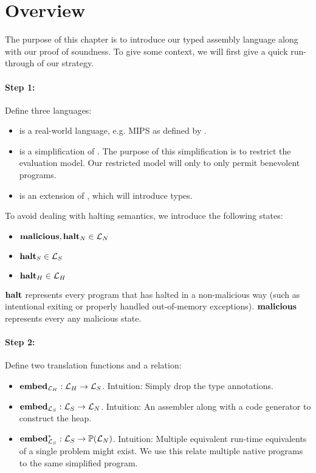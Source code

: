 \section{Overview}

The purpose of this chapter is to introduce our typed assembly language along
with our proof of soundness. To give some context, we will first give a quick
run-through of our strategy.

\paragraph{Step 1:} Define three languages:

\begin{itemize}
\item \nativelang is a real-world language, e.g. MIPS as defined by
  \cite{mipssys}.
\item \simplelang is a simplification of \nativelang. The purpose of
  this simplification is to restrict the evaluation model. Our restricted model
  will only to only permit benevolent programs.
\item \highlang is an extension of \simplelang, which will
  introduce types.
\end{itemize}

To avoid dealing with halting semantics, we introduce the following states:
\begin{itemize}
\item ${\mathbf{malicious}}, {\mathbf{halt}_N} \in \mathcal{L}_N$
\item ${\mathbf{halt}_S} \in \mathcal{L}_S$
\item ${\mathbf{halt}_H} \in \mathcal{L}_H$
\end{itemize}

$\mathbf{halt}$ represents every program that has halted in a non-malicious way (such as
intentional exiting or properly handled out-of-memory exceptions). ${\mathbf{malicious}}$
represents every any malicious state.

\paragraph{Step 2:} Define two translation functions and a relation:

\begin{itemize}
\item ${\mathbf{embed}}_{\mathcal{L}_H} : \mathcal{L}_H -> \mathcal{L}_S$. Intuition: Simply drop the type
  annotations.
\item ${\mathbf{embed}}_{\mathcal{L}_S} : \mathcal{L}_S -> \mathcal{L}_N$. Intuition: An assembler
  along with a code generator to construct the heap.
\item $\mathbf{embed}^\ast_{\mathcal{L}_S} : \mathcal{L}_S -> \mathbb{P}(\mathcal{L}_N)$. Intuition:
  Multiple equivalent run-time equivalents of a single problem might exist. We
  use this relate multiple native programs to the same simplified program.
\end{itemize}


